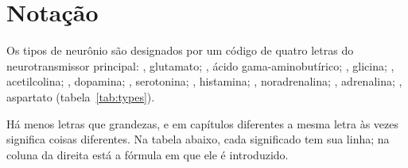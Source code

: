 \chapter{Notação}
\label{sec:notation}

Os tipos de neurônio são designados por um código de quatro letras do neurotransmissor principal: , glutamato; , ácido gama-aminobutírico; , glicina; , acetilcolina; , dopamina; , serotonina; , histamina; , noradrenalina; , adrenalina; , aspartato (tabela~\ref{tab:types}).

Há menos letras que grandezas, e em capítulos diferentes a mesma letra às vezes significa coisas diferentes. Na tabela abaixo, cada significado tem sua linha; na coluna da direita está a fórmula em que ele é introduzido.

